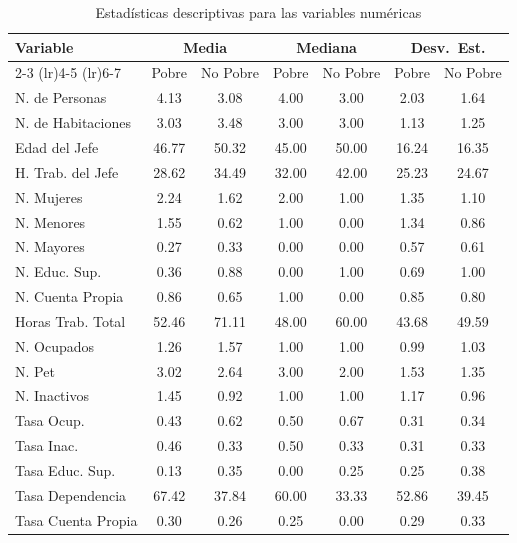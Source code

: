 \documentclass[12pt,a4paper,onecolumn]{article}
\begin{document}
\begin{table}[htbp]\centering
\caption{Estadísticas descriptivas para las variables numéricas}
\label{tab:descriptivas_pobreza}
\small
\begin{tabular}{lcccccc}
\toprule
\multirow{2}{*}{\textbf{Variable}} & 
\multicolumn{2}{c}{\textbf{Media}} & 
\multicolumn{2}{c}{\textbf{Mediana}} & 
\multicolumn{2}{c}{\textbf{Desv.~Est.}} \\
\cmidrule(lr){2-3} \cmidrule(lr){4-5} \cmidrule(lr){6-7}
 & Pobre & No Pobre & Pobre & No Pobre & Pobre & No Pobre \\
\midrule
N. de Personas              & 4.13 & 3.08 & 4.00 & 3.00 & 2.03 & 1.64 \\
N. de Habitaciones   & 3.03 & 3.48 & 3.00 & 3.00 & 1.13 & 1.25 \\
Edad del Jefe        & 46.77 & 50.32 & 45.00 & 50.00 & 16.24 & 16.35 \\
H. Trab. del Jefe     & 28.62 & 34.49 & 32.00 & 42.00 & 25.23 & 24.67 \\
N. Mujeres      & 2.24 & 1.62 & 2.00 & 1.00 & 1.35 & 1.10 \\
N. Menores       & 1.55 & 0.62 & 1.00 & 0.00 & 1.34 & 0.86 \\
N. Mayores     & 0.27 & 0.33 & 0.00 & 0.00 & 0.57 & 0.61 \\
N. Educ. Sup.    & 0.36 & 0.88 & 0.00 & 1.00 & 0.69 & 1.00 \\
N. Cuenta Propia    & 0.86 & 0.65 & 1.00 & 0.00 & 0.85 & 0.80 \\
Horas Trab. Total& 52.46 & 71.11 & 48.00 & 60.00 & 43.68 & 49.59 \\
N. Ocupados          & 1.26 & 1.57 & 1.00 & 1.00 & 0.99 & 1.03 \\
N. Pet         & 3.02 & 2.64 & 3.00 & 2.00 & 1.53 & 1.35 \\
N. Inactivos      & 1.45 & 0.92 & 1.00 & 1.00 & 1.17 & 0.96 \\
Tasa Ocup.            & 0.43 & 0.62 & 0.50 & 0.67 & 0.31 & 0.34 \\
Tasa Inac.           & 0.46 & 0.33 & 0.50 & 0.33 & 0.31 & 0.33 \\
Tasa Educ. Sup.      & 0.13 & 0.35 & 0.00 & 0.25 & 0.25 & 0.38 \\
Tasa Dependencia   & 67.42 & 37.84 & 60.00 & 33.33 & 52.86 & 39.45 \\
Tasa Cuenta Propia     & 0.30 & 0.26 & 0.25 & 0.00 & 0.29 & 0.33 \\
\bottomrule
\end{tabular}
\end{table} 
\end{document}
